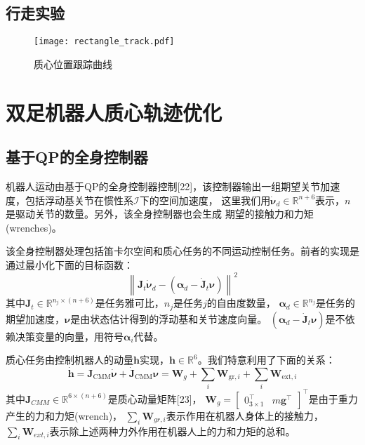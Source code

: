 \section{行走实验}
\begin{figure}[htbp]
    \centering
    \texttt{[image: rectangle\_track.pdf]}
    \caption{\label{fig:com_pos_track}质心位置跟踪曲线}
\end{figure}
\chapter{双足机器人质心轨迹优化}
\section{基于QP的全身控制器}
机器人运动由基于QP的全身控制器控制[22]，该控制器输出一组期望关节加速度，包括浮动基关节在惯性系$\mathcal{I}$下的空间加速度，
这里我们用$\dot{\boldsymbol{\nu}}_d \in \mathbb{R}^{n+6}$表示，$n$是驱动关节的数量。另外，该全身控制器也会生成
期望的接触力和力矩(wrenches)。

该全身控制器处理包括笛卡尔空间和质心任务的不同运动控制任务。前者的实现是通过最小化下面的目标函数：
\begin{equation}
    \label{equ:qp_objective}
    \left\|\boldsymbol{J}_t \dot{\boldsymbol{\nu}}_d-\left(\boldsymbol{\alpha}_d-\dot{\boldsymbol{J}}_t \boldsymbol{\nu}\right)\right\|^2
\end{equation}
其中$\boldsymbol{J}_t \in \mathbb{R}^{n_j \times (n+6)}$是任务雅可比，$n_j$是任务$j$的自由度数量，
$\boldsymbol{\alpha}_d \in \mathbb{R}^{n_j}$是任务的期望加速度，$\boldsymbol{\nu}$是由状态估计得到的浮动基和关节速度向量。
$\left(\boldsymbol{\alpha}_d-\dot{\boldsymbol{J}}_t \boldsymbol{\nu}\right)$是不依赖决策变量的向量，用符号$\boldsymbol{\alpha}_i$代替。

质心任务由控制机器人的动量$\boldsymbol{h}$实现，$\boldsymbol{h} \in \mathbb{R}^{6}$。我们特意利用了下面的关系：
\begin{equation}
    \label{equ:qp_momentum}
    \dot{\boldsymbol{h}}=\boldsymbol{J}_{\mathrm{CMM}} \dot{\boldsymbol{\nu}}+\dot{\boldsymbol{J}}_{\mathrm{CMM}} \boldsymbol{\nu}=\boldsymbol{W}_g+\sum_i \boldsymbol{W}_{\mathrm{gr}, i}+\sum_i \boldsymbol{W}_{\mathrm{ext}, i}
\end{equation}
其中$\boldsymbol{J}_{CMM} \in \mathbb{R}^{6 \times (n+6)}$是质心动量矩阵[23]，
$\boldsymbol{W}_g=\left[\begin{array}{ll}0_{3 \times 1}^{\top} & m \boldsymbol{g}^{\top}\end{array}\right]^{\top}$是由于重力产生的力和力矩(wrench)，
$\sum_i {\boldsymbol{W}_{gr,i}}$表示作用在机器人身体上的接触力，$\sum_i {\boldsymbol{W}_{ext,i}}$表示除上述两种力外作用在机器人上的力和力矩的总和。

